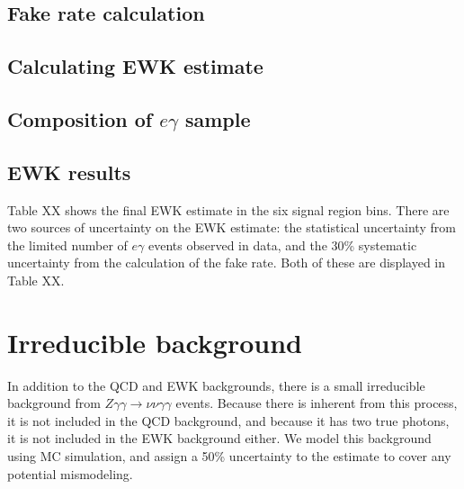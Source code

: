 \subsection{Fake rate calculation}
\label{sec:fakeRate}

\subsection{Calculating EWK estimate}

\subsection{Composition of $e\gamma$ sample}

\subsection{EWK results}
\label{sec:EWKresults}

Table XX shows the final EWK estimate in the six signal region bins. There are two sources of uncertainty on the EWK estimate: the statistical uncertainty from the limited number of $e\gamma$ events observed in data, and the 30\% systematic uncertainty from the calculation of the fake rate. Both of these are displayed in Table XX.


\section{Irreducible background}
\label{sec:Zgg}

In addition to the QCD and EWK backgrounds, there is a small irreducible background from $Z\gamma\gamma\rightarrow\nu\nu\gamma\gamma$ events. Because there is inherent \ETmiss from this process, it is not included in the QCD background, and because it has two true photons, it is not included in the EWK background either. We model this background using MC simulation, and assign a 50\% uncertainty to the estimate to cover any potential mismodeling. 

%
